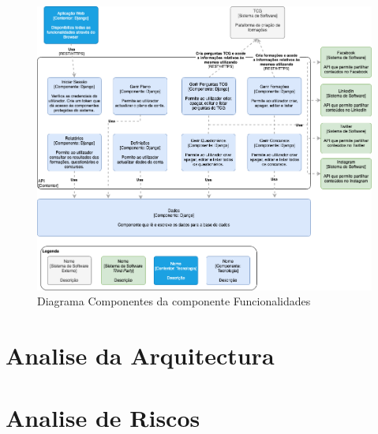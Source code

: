 \begin{figure}[ht!]
	\begin{center}
		\includegraphics[width=1\textwidth]{img/arq/diagrama-componentes1}
		\caption{Diagrama Componentes da componente Funcionalidades}
		\label{fig:arq-componentes1}
	\end{center}
\end{figure}

\section{Analise da Arquitectura}
\label{analiseriscos}

\section{Analise de Riscos}
\label{analiseriscos}
\blankpage

\glsresetall

